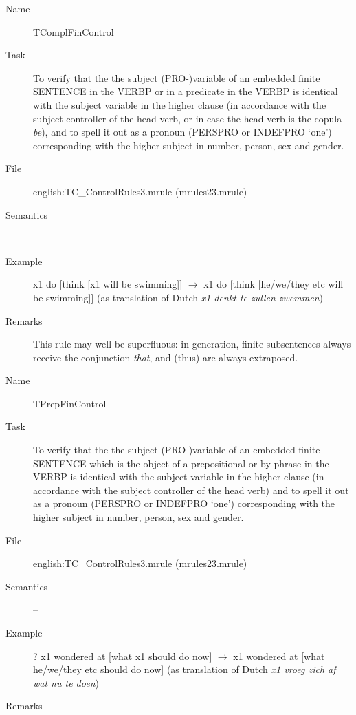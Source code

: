 \begin{description}
\vspace{1 cm}
\begin{description}
\item[Name] TComplFinControl
\item[Task] To verify that the the subject (PRO-)variable of an embedded 
finite SENTENCE in the VERBP or in a predicate in the VERBP 
is identical with the subject variable in the higher clause
(in accordance with the subject controller of the head verb, or in case the 
head verb is the copula {\em be\/}), 
and to spell it out as a pronoun (PERSPRO or INDEFPRO `one') corresponding 
with the higher subject in number, person, sex and gender.
\item[File] english:TC\_ControlRules3.mrule (mrules23.mrule)
\item[Semantics] --
\item[Example] x1 do [think [x1 will be swimming]] $\rightarrow$ x1 do 
[think [he/we/they etc will be swimming]] (as translation of Dutch {\em x1 
denkt te zullen zwemmen\/})
\item[Remarks] This rule may well be superfluous: in generation, finite 
subsentences always receive the conjunction {\em that\/}, and (thus) are always 
extraposed.
\end{description}

\vspace{1 cm}
\begin{description}
\item[Name] TPrepFinControl
\item[Task] To verify that the the subject (PRO-)variable of an embedded 
finite SENTENCE which is the object of a prepositional or by-phrase in the 
VERBP is identical with the subject variable in the higher clause
(in accordance with the subject controller of the head verb)
and to spell it out as a pronoun (PERSPRO or INDEFPRO `one') corresponding 
with the higher subject in number, person, sex and gender.
\item[File] english:TC\_ControlRules3.mrule (mrules23.mrule)
\item[Semantics] --
\item[Example] ? x1 wondered at [what x1 should do now] $\rightarrow$ 
x1 wondered at [what he/we/they etc should do now] (as translation of 
Dutch {\em x1 vroeg zich af wat nu te doen\/})
\item[Remarks] 
\end{description}

\end{description}

